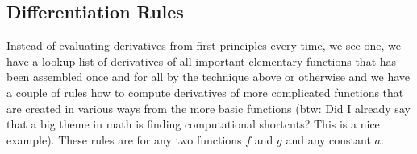 %
%


\subsection{Differentiation Rules}
Instead of evaluating derivatives from first principles every time, we see one, we have a lookup list of derivatives of all important elementary functions that has been assembled once and for all by the technique above or otherwise and we have a couple of rules how to compute derivatives of more complicated functions that are created in various ways from the more basic functions (btw: Did I already say that a big theme in math is finding computational shortcuts? This is a nice example). These rules are for any two functions $f$ and $g$ and any constant $a$:

